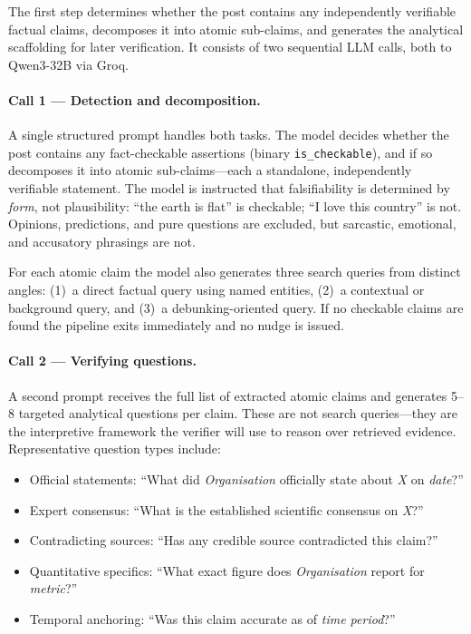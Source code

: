 The first step determines whether the post contains any independently verifiable factual claims, decomposes it into atomic sub-claims, and generates the analytical scaffolding for later verification. It consists of two sequential LLM calls, both to Qwen3-32B via Groq.

\paragraph{Call 1 --- Detection and decomposition.}
A single structured prompt handles both tasks. The model decides whether the post contains any fact-checkable assertions (binary \texttt{is\_checkable}), and if so decomposes it into atomic sub-claims---each a standalone, independently verifiable statement. The model is instructed that falsifiability is determined by \emph{form}, not plausibility: ``the earth is flat'' is checkable; ``I love this country'' is not. Opinions, predictions, and pure questions are excluded, but sarcastic, emotional, and accusatory phrasings are not.

For each atomic claim the model also generates three search queries from distinct angles: (1)~a direct factual query using named entities, (2)~a contextual or background query, and (3)~a debunking-oriented query. If no checkable claims are found the pipeline exits immediately and no nudge is issued.

\paragraph{Call 2 --- Verifying questions.}
A second prompt receives the full list of extracted atomic claims and generates 5--8 targeted analytical questions per claim. These are not search queries---they are the interpretive framework the verifier will use to reason over retrieved evidence. Representative question types include:
\begin{itemize}
  \item Official statements: ``What did \textit{Organisation} officially state about \textit{X} on \textit{date}?''
  \item Expert consensus: ``What is the established scientific consensus on \textit{X}?''
  \item Contradicting sources: ``Has any credible source contradicted this claim?''
  \item Quantitative specifics: ``What exact figure does \textit{Organisation} report for \textit{metric}?''
  \item Temporal anchoring: ``Was this claim accurate as of \textit{time period}?''
\end{itemize}

